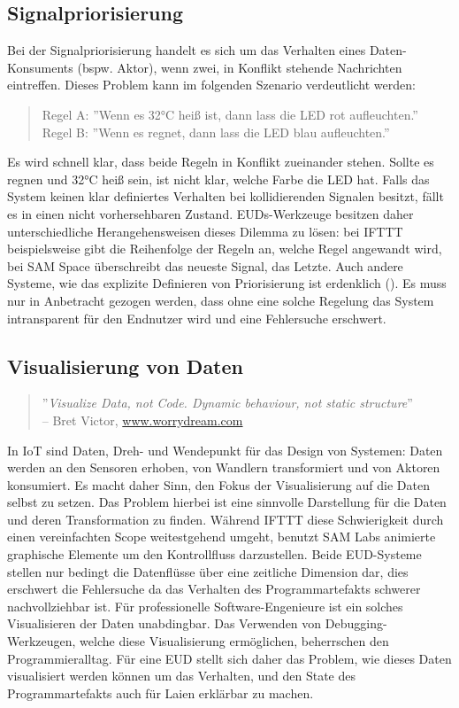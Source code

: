 \subsection{Signalpriorisierung}
Bei der Signalpriorisierung handelt es sich um das Verhalten eines Daten-Konsuments (bspw. Aktor), wenn zwei, in Konflikt stehende Nachrichten eintreffen. Dieses Problem kann im folgenden Szenario verdeutlicht werden:
\begin{quote}
Regel A: ''Wenn es 32°C heiß ist, dann lass die LED rot aufleuchten.'' \\
Regel B: ''Wenn es regnet, dann lass die LED blau aufleuchten.''
\end{quote}
Es wird schnell klar, dass beide Regeln in Konflikt zueinander stehen. Sollte es regnen und 32°C heiß sein, ist nicht klar, welche Farbe die LED hat. Falls das System keinen klar definiertes Verhalten bei kollidierenden Signalen besitzt, fällt es in einen nicht vorhersehbaren Zustand. \acp{EUD}-Werkzeuge besitzen daher unterschiedliche Herangehensweisen dieses Dilemma zu lösen: bei IFTTT beispielsweise gibt die Reihenfolge der Regeln an, welche Regel angewandt wird, bei SAM Space überschreibt das neueste Signal, das Letzte. Auch andere Systeme, wie das explizite Definieren von Priorisierung ist erdenklich (\cite{MacLaurin2011kodu}). Es muss nur in Anbetracht gezogen werden, dass ohne eine solche Regelung das System intransparent für den Endnutzer wird und eine Fehlersuche erschwert.

\subsection{Visualisierung von Daten}
\begin{quote}
    ''\textit{Visualize Data, not Code. Dynamic behaviour, not static structure}'' \\ -- Bret Victor, \url{www.worrydream.com}
\end{quote}
In \ac{IoT} sind Daten, Dreh- und Wendepunkt für das Design von Systemen: Daten werden an den Sensoren erhoben, von Wandlern transformiert und von Aktoren konsumiert. Es macht daher Sinn, den Fokus der Visualisierung auf die Daten selbst zu setzen. Das Problem hierbei ist eine sinnvolle Darstellung für die Daten und deren Transformation zu finden. Während IFTTT diese Schwierigkeit durch einen vereinfachten Scope weitestgehend umgeht, benutzt SAM Labs animierte graphische Elemente um den Kontrollfluss darzustellen. Beide \ac{EUD}-Systeme stellen nur bedingt die Datenflüsse über eine zeitliche Dimension dar, dies erschwert die Fehlersuche da das Verhalten des Programmartefakts schwerer nachvollziehbar ist. Für professionelle Software-Engenieure ist ein solches Visualisieren der Daten unabdingbar. Das Verwenden von Debugging-Werkzeugen, welche diese Visualisierung ermöglichen, beherrschen den Programmier\-alltag. Für eine \ac{EUD} stellt sich daher das Problem, wie dieses Daten visualisiert werden können um das Verhalten, und den State des Programmartefakts auch für Laien erklärbar zu machen. 

